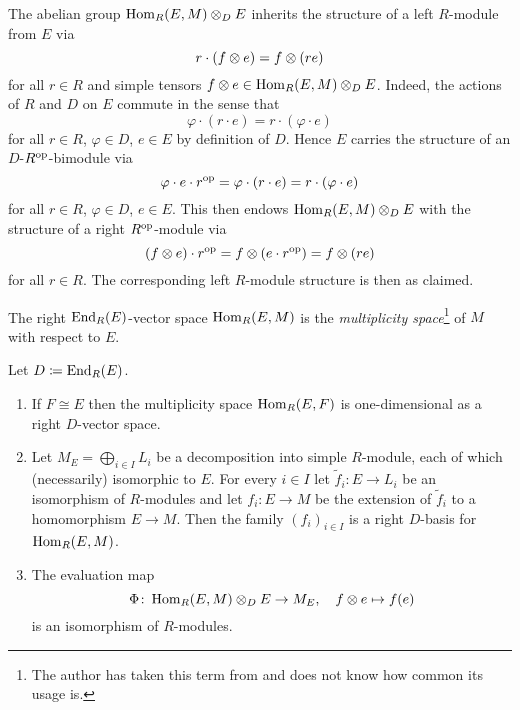 \begin{fluff}
  The abelian group $\operatorname{Hom}_R(E,M) \mathbin{\otimes}_D E$ inherits the structure of a left $R$-module from $E$ via
  \[
      r \cdot (f \mathbin{\otimes} e)
    = f \mathbin{\otimes} (r e)
  \]
  for all $r \in R$ and simple tensors $f \mathbin{\otimes} e \in \operatorname{Hom}_R(E,M) \mathbin{\otimes}_D E$.
  Indeed, the actions of $R$ and $D$ on $E$ commute in the sense that
  \[
      \varphi \cdot (r \cdot e)
    = r \cdot (\varphi \cdot e)
  \]
  for all $r \in R$, $\varphi \in D$, $e \in E$ by definition of $D$.
  Hence $E$ carries the structure of an $D$-$R^{\operatorname{op}}$-bimodule via
  \[
      \varphi \cdot e \cdot r^{\operatorname{op}}
    = \varphi \cdot (r \cdot e)
    = r \cdot (\varphi \cdot e)
  \]
  for all $r \in R$, $\varphi \in D$, $e \in E$.
  This then endows $\operatorname{Hom}_R(E,M) \mathbin{\otimes}_D E$ with the structure of a right $R^{\operatorname{op}}$-module via
  \[
      (f \mathbin{\otimes} e) \cdot r^{\operatorname{op}}
    = f \mathbin{\otimes} (e \cdot r^{\operatorname{op}})
    = f \mathbin{\otimes} (r e)
  \]
  for all $r \in R$.
  The corresponding left $R$-module structure is then as claimed.
\end{fluff}


\begin{definition}
  The right $\operatorname{End}_R(E)$-vector space $\operatorname{Hom}_R(E,M)$ is the \emph{multiplicity space}\footnote{
  The author has taken this term from \cite{AP2012DoubleCommutant} and does not know how common its usage is.
  } of $M$ with respect to $E$.
\end{definition}


\begin{proposition}
  \label{proposition: multiplicity spaces}
    Let $D \coloneqq \operatorname{End}_R(E)$.
    \begin{enumerate}
    \item
      \label{enumerate: one-dimensional as D vector space}
      If $F \cong E$ then the multiplicity space $\operatorname{Hom}_R(E,F)$ is one-dimensional as a right $D$-vector space.
    \item
      \label{enumerate: basis of multiplicity space}
      Let $M_E = \bigoplus_{i \in I} L_i$ be a decomposition into simple $R$-module, each of which (necessarily) isomorphic to $E$.
      For every $i \in I$ let $\tilde{f}_i \colon E \to L_i$ be an isomorphism of $R$-modules and let $f_i \colon E \to M$ be the extension of $\tilde{f}_i$ to a homomorphism $E \to M$.
      Then the family $(f_i)_{i \in I}$ is a right $D$-basis for $\operatorname{Hom}_R(E,M)$.
    \item
      The evaluation map
      \[
                \Phi
        \colon  \operatorname{Hom}_R(E,M) \mathbin{\otimes}_D E
        \to     M_E,
        \quad   f \mathbin{\otimes} e
        \mapsto f(e)
      \]
      is an isomorphism of $R$-modules.
  \end{enumerate}
\end{proposition}


